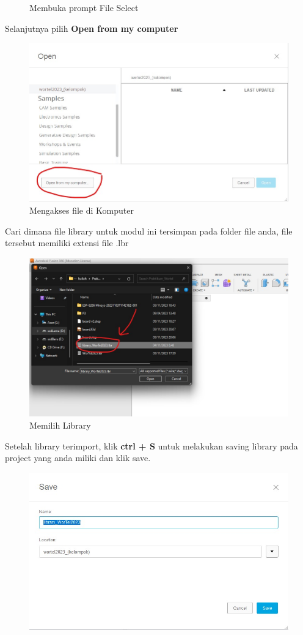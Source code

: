 \begin{enumerate}
\begin{figure}[H]
            \caption{Membuka prompt File Select} 
            \label{fig:Membuka prompt File Select}
        \end{figure}
    Selanjutnya pilih \textbf{Open from my computer}
    \begin{figure}[H]
        \centering
        \includegraphics[width=0.6\linewidth]{P2/img/gambar4.jpeg}
        \caption{Mengakses file di Komputer} 
        \label{fig:Mengakses file di Komputer}
    \end{figure}
    Cari dimana file library untuk modul ini tersimpan pada folder file anda, file tersebut memiliki extensi file .lbr
    \begin{figure}[H]
        \centering
        \includegraphics[width=0.6\linewidth]{P2/img/gambar5.jpeg}
        \caption{Memilih Library} 
        \label{fig:Memilih Library}
    \end{figure}
    Setelah library terimport, klik \textbf{ctrl + S} untuk melakukan saving library pada project yang anda miliki dan klik save.
    \begin{figure}[H]
        \centering
        \includegraphics[width=0.6\linewidth]{P2/img/gambar6.jpeg}

\end{figure}
\end{enumerate}
